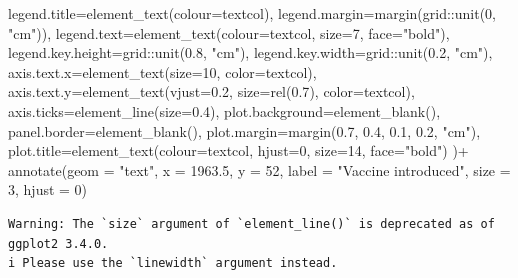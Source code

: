 \documentclass[
  letterpaper,
  DIV=11,
  numbers=noendperiod]{scrreprt}
\newenvironment{Shaded}{\begin{snugshade}}{\end{snugshade}}
\newcommand{\AttributeTok}[1]{\textcolor[rgb]{0.40,0.45,0.13}{#1}}
\newcommand{\DecValTok}[1]{\textcolor[rgb]{0.68,0.00,0.00}{#1}}
\newcommand{\FloatTok}[1]{\textcolor[rgb]{0.68,0.00,0.00}{#1}}
\newcommand{\FunctionTok}[1]{\textcolor[rgb]{0.28,0.35,0.67}{#1}}
\newcommand{\NormalTok}[1]{\textcolor[rgb]{0.00,0.23,0.31}{#1}}
\newcommand{\SpecialCharTok}[1]{\textcolor[rgb]{0.37,0.37,0.37}{#1}}
\newcommand{\StringTok}[1]{\textcolor[rgb]{0.13,0.47,0.30}{#1}}
\begin{document}
\begin{Shaded}
\begin{Highlighting}[]
        \AttributeTok{legend.title=}\FunctionTok{element\_text}\NormalTok{(}\AttributeTok{colour=}\NormalTok{textcol),}
        \AttributeTok{legend.margin=}\FunctionTok{margin}\NormalTok{(grid}\SpecialCharTok{::}\FunctionTok{unit}\NormalTok{(}\DecValTok{0}\NormalTok{, }\StringTok{"cm"}\NormalTok{)),}
        \AttributeTok{legend.text=}\FunctionTok{element\_text}\NormalTok{(}\AttributeTok{colour=}\NormalTok{textcol, }\AttributeTok{size=}\DecValTok{7}\NormalTok{, }\AttributeTok{face=}\StringTok{"bold"}\NormalTok{),}
        \AttributeTok{legend.key.height=}\NormalTok{grid}\SpecialCharTok{::}\FunctionTok{unit}\NormalTok{(}\FloatTok{0.8}\NormalTok{, }\StringTok{"cm"}\NormalTok{),}
        \AttributeTok{legend.key.width=}\NormalTok{grid}\SpecialCharTok{::}\FunctionTok{unit}\NormalTok{(}\FloatTok{0.2}\NormalTok{, }\StringTok{"cm"}\NormalTok{),}
        \AttributeTok{axis.text.x=}\FunctionTok{element\_text}\NormalTok{(}\AttributeTok{size=}\DecValTok{10}\NormalTok{, }\AttributeTok{color=}\NormalTok{textcol),}
        \AttributeTok{axis.text.y=}\FunctionTok{element\_text}\NormalTok{(}\AttributeTok{vjust=}\FloatTok{0.2}\NormalTok{, }\AttributeTok{size=}\FunctionTok{rel}\NormalTok{(}\FloatTok{0.7}\NormalTok{), }\AttributeTok{color=}\NormalTok{textcol),}
        \AttributeTok{axis.ticks=}\FunctionTok{element\_line}\NormalTok{(}\AttributeTok{size=}\FloatTok{0.4}\NormalTok{),}
        \AttributeTok{plot.background=}\FunctionTok{element\_blank}\NormalTok{(),}
        \AttributeTok{panel.border=}\FunctionTok{element\_blank}\NormalTok{(),}
        \AttributeTok{plot.margin=}\FunctionTok{margin}\NormalTok{(}\FloatTok{0.7}\NormalTok{, }\FloatTok{0.4}\NormalTok{, }\FloatTok{0.1}\NormalTok{, }\FloatTok{0.2}\NormalTok{, }\StringTok{"cm"}\NormalTok{),}
        \AttributeTok{plot.title=}\FunctionTok{element\_text}\NormalTok{(}\AttributeTok{colour=}\NormalTok{textcol, }\AttributeTok{hjust=}\DecValTok{0}\NormalTok{, }\AttributeTok{size=}\DecValTok{14}\NormalTok{, }\AttributeTok{face=}\StringTok{"bold"}\NormalTok{)}
\NormalTok{      )}\SpecialCharTok{+} 
  \FunctionTok{annotate}\NormalTok{(}\AttributeTok{geom =} \StringTok{"text"}\NormalTok{, }\AttributeTok{x =} \FloatTok{1963.5}\NormalTok{, }\AttributeTok{y =} \DecValTok{52}\NormalTok{, }\AttributeTok{label =} \StringTok{"Vaccine introduced"}\NormalTok{, }\AttributeTok{size =} \DecValTok{3}\NormalTok{, }\AttributeTok{hjust =} \DecValTok{0}\NormalTok{)}
\end{Highlighting}
\end{Shaded}

\begin{verbatim}
Warning: The `size` argument of `element_line()` is deprecated as of ggplot2 3.4.0.
i Please use the `linewidth` argument instead.
\end{verbatim}
\end{document}
